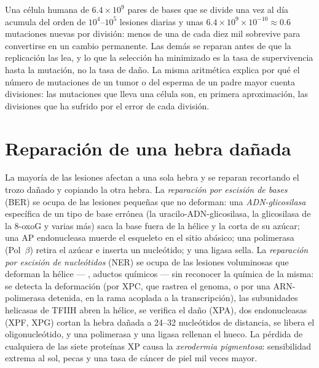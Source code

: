 \begin{example}\label{ex:b3:dna-repair:numbers}
Una célula humana de $6.4\times 10^{9}$ pares de bases que se divide una
vez al día acumula del orden de $10^{4}$--$10^{5}$ lesiones diarias y
unas $6.4\times 10^{9}\times 10^{-10} \approx 0.6$ mutaciones nuevas por
división: menos de una  de cada diez mil sobrevive para convertirse
en un cambio permanente. Las demás se reparan antes de que la replicación
las lea, y lo que la selección ha minimizado es la tasa de supervivencia
hasta la mutación, no la tasa de daño. La misma aritmética explica por
qué el número de mutaciones de un tumor o del esperma de un padre mayor
cuenta divisiones: las mutaciones que lleva una célula son, en primera
aproximación, las divisiones que ha sufrido por el error de cada
división.
\end{example}

\section{Reparación de una hebra dañada}

\begin{definition}\label{def:b3:dna-repair:excision}
La mayoría de las lesiones afectan a una sola hebra y se reparan
recortando el trozo dañado y copiando la otra hebra. La \emph{reparación
por escisión de bases} (BER) se ocupa de las lesiones pequeñas que no
deforman: una \emph{ADN-glicosilasa} específica de un tipo de base
errónea (la uracilo-ADN-glicosilasa, la glicosilasa de la 8-oxoG y varias
más) saca la base fuera de la hélice y la corta de su azúcar; una AP
endonucleasa muerde el esqueleto en el sitio abásico; una polimerasa
(Pol~$\beta$) retira el azúcar e inserta un nucleótido; y una ligasa
sella. La \emph{reparación por escisión de nucleótidos} (NER) se ocupa de
las lesiones voluminosas que deforman la hélice --- ,
aductos químicos --- sin reconocer la química de la  misma: se
detecta la deformación (por XPC, que rastrea el genoma, o por una
ARN-polimerasa detenida, en la rama acoplada a la transcripción), las
subunidades helicasas de TFIIH abren la hélice, se verifica el daño
(XPA), dos endonucleasas (XPF, XPG) cortan la hebra dañada a
\numrange{24}{32} nucleótidos de distancia, se libera el oligonucleótido,
y una polimerasa y una ligasa rellenan el hueco. La pérdida de cualquiera
de las siete proteínas XP causa la \emph{xerodermia pigmentosa}:
sensibilidad extrema al sol, pecas y una tasa de cáncer de piel mil veces
mayor.
\end{definition}

